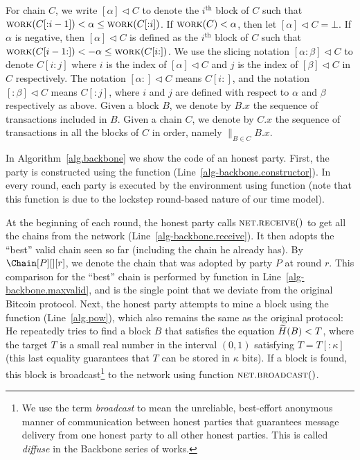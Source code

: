 \noindent
{}
For chain $C$, we write $[\alpha] \lhd C$
to denote the $i^\text{th}$ block of $C$ such that
$\textsc{work}(C[{:}{i - 1}]) < \alpha \leq \textsc{work}(C[{:}{i}])$.
If $\textsc{work}(C) < \alpha$, then let $[\alpha] \lhd C = \bot$.
If $\alpha$ is negative, then $[\alpha] \lhd C$ is defined as
the $i^\text{th}$ block of $C$ such that
$\textsc{work}(C[{i - 1}{:}]) < -\alpha \leq \textsc{work}(C[{i}{:}])$.
We use the slicing notation $[{\alpha}{:}{\beta}] \lhd C$ to denote
$C[{i}{:}{j}]$ where $i$ is the index of $[\alpha] \lhd C$
and $j$ is the index of $[\beta] \lhd C$ in $C$ respectively.
The notation $[{\alpha}{:}] \lhd C$ means $C[{i}{:}]$,
and the notation $[{:}\beta] \lhd C$ means $C[{:}{j}]$,
where $i$ and $j$ are defined with respect to $\alpha$ and $\beta$
respectively as above.
Given a block $B$, we denote by $B.x$ the sequence of transactions
included in $B$.
Given a chain $C$, we denote by $C.x$
the sequence of transactions in all the blocks of $C$ in order, namely
${\big\lVert}_{B \in C} B.x$.

In Algorithm~\ref{alg.backbone} we show the code of an honest party.
First, the party is constructed using the \constructor function (Line~\ref{alg-backbone.constructor}).
In every round, each party is executed by the environment using function \execute
(note that this function is due to the lockstep round-based nature of
our time model).

At the beginning of each round, the honest party calls $\textsc{net}.\textsc{receive}()$ to get all
the chains from the network (Line~\ref{alg-backbone.receive}).
It then adopts the ``best'' valid chain seen so far (including the chain
he already has). By $\Chain[P][][r]$, we denote the chain that was adopted
by party $P$ at round $r$.
This comparison for the ``best'' chain is performed by
function \maxvalid in Line~\ref{alg-backbone.maxvalid}, and
is the single point that we deviate from the original Bitcoin protocol.
Next, the honest party attempts to mine a block using the \pow function (Line~\ref{alg.pow}),
which also remains the same as the original protocol: He repeatedly tries to find a block $B$
that satisfies the \pow equation $\widetilde{H}(B) < T$, where the target $T$ is a small real number in
the interval $(0, 1)$ satisfying $T = T[{:}\kappa]$ (this last equality guarantees that $T$ can be stored in
$\kappa$ bits).
If a block is found, this block is broadcast\footnote{We use the term \emph{broadcast}
to mean the unreliable, best-effort anonymous manner of communication between honest parties that
guarantees message delivery from one honest party to all other honest parties.
This is called \emph{diffuse} in the Backbone series of works.}
to the network using function $\textsc{net}.\textsc{broadcast}()$.

